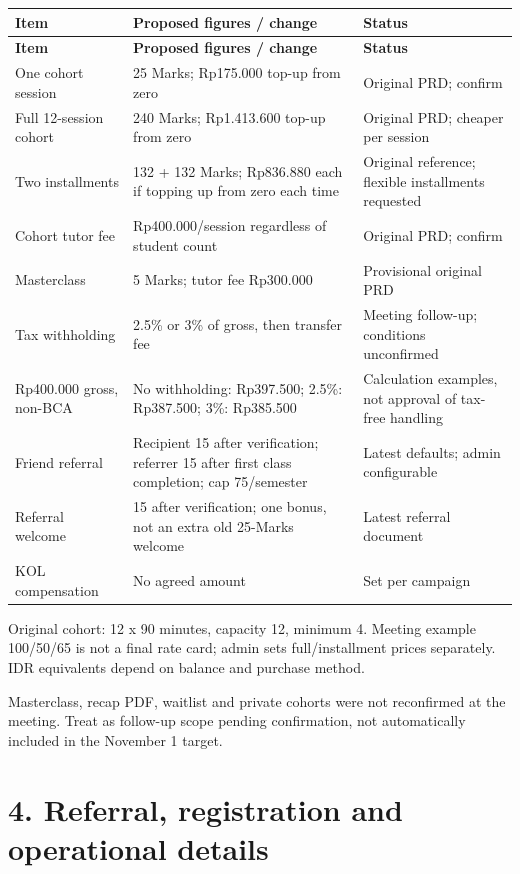 \documentclass[11pt,a4paper]{article}
\begin{document}
{\small
\begin{longtable}{|L{28.54mm}|L{52.57mm}|L{69.09mm}|}
\hline
\textbf{Item} & \textbf{Proposed figures /\allowbreak{} change} & \textbf{Status} \\ \hline
\endfirsthead
\hline
\textbf{Item} & \textbf{Proposed figures /\allowbreak{} change} & \textbf{Status} \\ \hline
\endhead
One cohort session & 25 Marks; Rp175.000 top-up from zero & Original PRD; confirm \\ \hline
Full 12-session cohort & 240 Marks; Rp1.413.600 top-up from zero & Original PRD; cheaper per session \\ \hline
Two installments & 132 + 132 Marks; Rp836.880 each if topping up from zero each time & Original reference; flexible installments requested \\ \hline
Cohort tutor fee & Rp400.000/\allowbreak{}session regardless of student count & Original PRD; confirm \\ \hline
Masterclass & 5 Marks; tutor fee Rp300.000 & Provisional original PRD \\ \hline
Tax withholding & 2.5\% or 3\% of gross, then transfer fee & Meeting follow-up; conditions unconfirmed \\ \hline
Rp400.000 gross, non-BCA & No withholding: Rp397.500; 2.5\%: Rp387.500; 3\%: Rp385.500 & Calculation examples, not approval of tax-free handling \\ \hline
Friend referral & Recipient 15 after verification; referrer 15 after first class completion; cap 75/\allowbreak{}semester & Latest defaults; admin configurable \\ \hline
Referral welcome & 15 after verification; one bonus, not an extra old 25-Marks welcome & Latest referral document \\ \hline
KOL compensation & No agreed amount & Set per campaign \\ \hline
\end{longtable}
}

Original cohort: 12  x  90 minutes, capacity 12, minimum 4. Meeting example 100/\allowbreak{}50/\allowbreak{}65 is not a final rate card; admin sets full/\allowbreak{}installment prices separately. IDR equivalents depend on balance and purchase method.

Masterclass, recap PDF, waitlist and private cohorts were not reconfirmed at the meeting. Treat as follow-up scope pending confirmation, not automatically included in the November 1 target.

\section*{4. Referral, registration and operational details}
\end{document}
